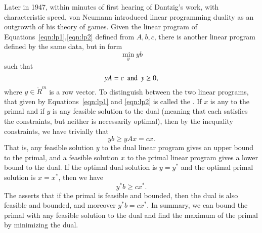 Later in 1947, within minutes of first hearing of Dantzig's work, with
characteristic speed, von Neumann introduced linear programming
duality as an outgrowth of his theory of games.  Given the linear
program of Equations~\ref{eqn:lp1},\ref{eqn:lp2} defined from $A,b,c$,
there is another linear program defined by the same data, but in
 form
\begin{equation}
\min_y {y b}
\end{equation}
such that
\begin{equation}
y A = c \text{ \ and \ }  y \ge 0,
\end{equation}
where $y\in\ring{R}^m$ is a row vector.  To distinguish between the two linear
programs, that given by Equations~\ref{eqn:lp1} and \ref{eqn:lp2}
is called the .  If $x$ is any  to the primal and if $y$ is any feasible solution to the
dual (meaning that each satisfies the constraints, but neither is
necessarily optimal), then by the inequality constraints, we have
trivially that
\[y b \ge y A x = c x.\]
That is, any feasible solution $y$ to the dual linear program gives an
upper bound to the primal, and a feasible solution $x$ to the primal
linear program gives a lower bound to the dual.  If the optimal dual
solution is $y=y^*$ and the optimal primal solution is $x=x^*$, then
we have
\[y^* b \ge c x^*.\]
The  asserts that if the
primal is feasible and bounded, then the dual is also feasible and
bounded, and moreover $y^* b = c x^*$.  In summary, we can bound the
primal with any feasible solution to the dual and find the maximum of
the primal by minimizing the dual.

%
%


